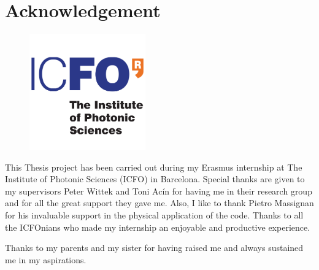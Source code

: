 \thispagestyle{empty}
\chapter*{Acknowledgement}

\begin{figure}[h!]
\centering
   \includegraphics[width=5cm]{Figs/logo_icfo.png}
\end{figure}

\noindent This Thesis project has been carried out during my Erasmus internship at The Institute of Photonic Sciences (ICFO) in Barcelona. Special thanks are given to my supervisors Peter Wittek and Toni Acín for having me in their research group and for all the great support they gave me.
Also, I like to thank Pietro Massignan for his invaluable support in the physical application of the code.
Thanks to all the ICFOnians who made my internship an enjoyable and productive experience. 

\vspace{1cm}

\noindent Thanks to my parents and my sister for having raised me and always sustained me in my aspirations.